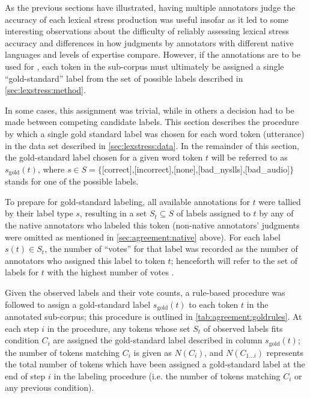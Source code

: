 		
		As the previous sections have illustrated, having multiple annotators judge the accuracy of each lexical stress production was useful insofar as it led to some interesting observations about the difficulty of reliably assessing lexical stress accuracy and differences in how judgments by annotators with different native languages and levels of expertise compare. However, if the annotations are to be used for , each token in the sub-corpus must ultimately be assigned a single ``gold-standard'' label from the set of possible labels described in \cref{sec:lexstress:method}.
		
		In some cases, this assignment was trivial, while in others a decision had to be made between competing candidate labels. This section describes the procedure by which a single gold standard label was chosen for each word token (utterance) in the data set described in \cref{sec:lexstress:data}. In the remainder of this section, the gold-standard label chosen for a given word token $t$ will be referred to as $s_{\text{gold}}(t)$, where $s \in S = \{$[correct],{[incorrect]},{[none]},{[bad\_nyslls]},{[bad\_audio]}$\}$ stands for one of the possible labels.
		
		To prepare for gold-standard labeling, all available annotations for $t$ were tallied by their label type $s$, resulting in a set $S_t \subseteq S$ of labels assigned to $t$ by any of the native annotators who labeled this token (non-native annotators' judgments were omitted as mentioned in \cref{sec:agreement:native} above). For each label $s(t) \in S_t$, the number of ``votes'' for that label was recorded as the number of annotators who assigned this label to token $t$; henceforth  will refer to the set of labels for $t$ with the highest number of votes .
		
		Given the observed labels and their vote counts, a rule-based procedure was followed to assign a gold-standard label $s_{\text{gold}}(t)$ to each token $t$ in the annotated sub-corpus; this procedure is outlined in \cref{tab:agreement:goldrules}. At each step $i$ in the procedure, any tokens whose set $S_t$ of observed labels fits condition $C_i$ are assigned the gold-standard label described in column $s_{\text{gold}}(t)$; the number of tokens matching $C_i$ is given as $N(C_i)$, and 
		$N(C_{1 \dots i})$ represents the total number of tokens which have been assigned a gold-standard label at the end of step $i$ in the labeling procedure (i.e. the number of tokens matching $C_i$ or any previous condition).
		
